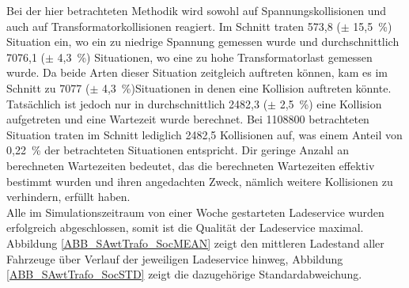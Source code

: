 Bei der hier betrachteten Methodik wird sowohl auf Spannungskollisionen und auch auf Transformatorkollisionen reagiert. Im Schnitt traten 573,8 ($\pm$ 15,5~\%) Situation ein, wo ein zu niedrige Spannung gemessen wurde und durchschnittlich 7076,1 ($\pm$ 4,3~\%) Situationen, wo eine zu hohe Transformatorlast gemessen wurde. Da beide Arten dieser Situation zeitgleich auftreten können, kam es im Schnitt zu 7077 ($\pm$ 4,3~\%)Situationen in denen eine Kollision auftreten könnte. Tatsächlich ist jedoch nur in durchschnittlich 2482,3 ($\pm$ 2,5~\%) eine Kollision aufgetreten und eine Wartezeit wurde berechnet. Bei 1108800 betrachteten Situation traten im Schnitt lediglich 2482,5 Kollisionen auf, was einem Anteil von 0,22~\% der betrachteten Situationen entspricht. Dir geringe Anzahl an berechneten Wartezeiten bedeutet, das die berechneten Wartezeiten effektiv bestimmt wurden und ihren angedachten Zweck, nämlich weitere Kollisionen zu verhindern, erfüllt haben.\\
Alle im Simulationszeitraum von einer Woche gestarteten Ladeservice wurden erfolgreich abgeschlossen, somit ist die Qualität der Ladeservice maximal. Abbildung \ref{ABB_SAwtTrafo_SocMEAN} zeigt den mittleren Ladestand aller Fahrzeuge über Verlauf der jeweiligen Ladeservice hinweg, Abbildung \ref{ABB_SAwtTrafo_SocSTD} zeigt die dazugehörige Standardabweichung.\\
